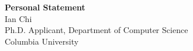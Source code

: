 \documentclass[11pt]{article}
\begin{document}
\begin{center}
    {\Large \textbf{Personal Statement}}\\[4pt]
    {\large Ian Chi}\\[2pt]
    Ph.D. Applicant, Department of Computer Science\\
    Columbia University
\end{center}

\vspace{1em}

\end{document}
